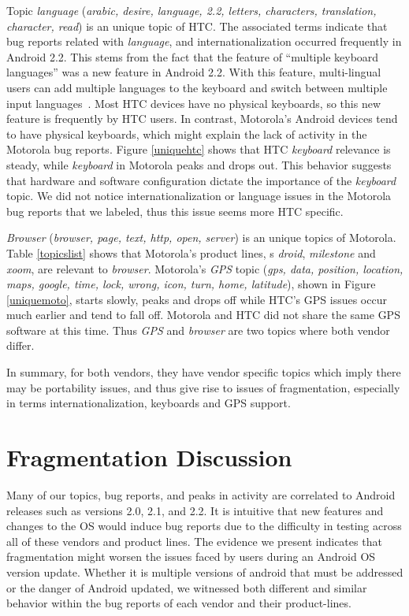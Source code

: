 \documentclass[10pt, conference, compsocconf]{IEEEtran}
\begin{document}
Topic \textit{language} (\textit{arabic, desire, language, 2.2, letters,
  characters, translation, character, read}) is an unique topic of
HTC. The associated terms indicate that bug reports related with
\textit{language}, and internationalization occurred frequently in
Android 2.2. 
This stems from
the fact that the feature of ``multiple keyboard languages'' was a new
feature in Android 2.2. With this feature, multi-lingual users can add
multiple languages to the keyboard and switch between multiple
input languages~\cite{androidwebsite}. Most
HTC devices have no physical keyboards, so this new feature is 
frequently by HTC users. In contrast, Motorola's Android devices tend
to  have physical keyboards, which might explain the lack of activity
in the  Motorola bug reports.
Figure \ref{uniquehtc} shows that
HTC \textit{keyboard} relevance is steady, while \textit{keyboard} in
Motorola peaks and drops out. This behavior suggests that hardware
and software configuration dictate the importance of the \emph{keyboard}
topic.
We did not notice internationalization or language issues in the
Motorola bug reports that we labeled, thus this issue seems more HTC
specific.


\textit{Browser} (\textit{browser, page, text, http, open, server}) is
an unique topics of Motorola. Table \ref{topicslist} shows that
Motorola's product lines,
s \textit{droid}, \textit{milestone} and \textit{xoom}, are relevant
to \textit{browser}.
Motorola's \textit{GPS} topic
(\textit{gps, data, position, location, maps, google, time, lock,
  wrong, icon, turn, home, latitude}), shown in Figure
\ref{uniquemoto},
starts slowly, peaks and drops off while HTC's GPS issues occur much
earlier and tend to fall off.
Motorola and HTC did not share the same GPS software at this
time. Thus \emph{GPS} and \emph{browser} are two topics where both vendor differ.

In summary, for both vendors, they have vendor specific topics which imply
there may be portability issues, and thus give rise to issues of
fragmentation, especially in terms internationalization, keyboards and
GPS support.

\section{Fragmentation Discussion}
\label{sec:fragmentation}


Many of our topics, bug reports, and peaks in activity are correlated
to Android releases such as versions 2.0, 2.1, and 2.2. It is
intuitive that new features and changes to the OS would induce bug
reports due to the difficulty in testing across all of these vendors
and product lines. The evidence we present indicates that
fragmentation might worsen the issues faced by users during an Android
OS version update.
Whether it is multiple versions of android that must be addressed or
the danger of Android updated, we witnessed both different and similar
behavior within the bug reports of each vendor and their product-lines.
\end{document}
